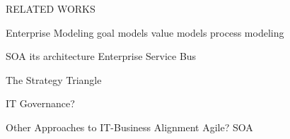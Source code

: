 RELATED WORKS

Enterprise Modeling
  goal models
  value models
  process modeling
  

SOA
  its architecture
  Enterprise Service Bus

The Strategy Triangle

IT Governance?

Other Approaches to IT-Business Alignment
Agile?
SOA